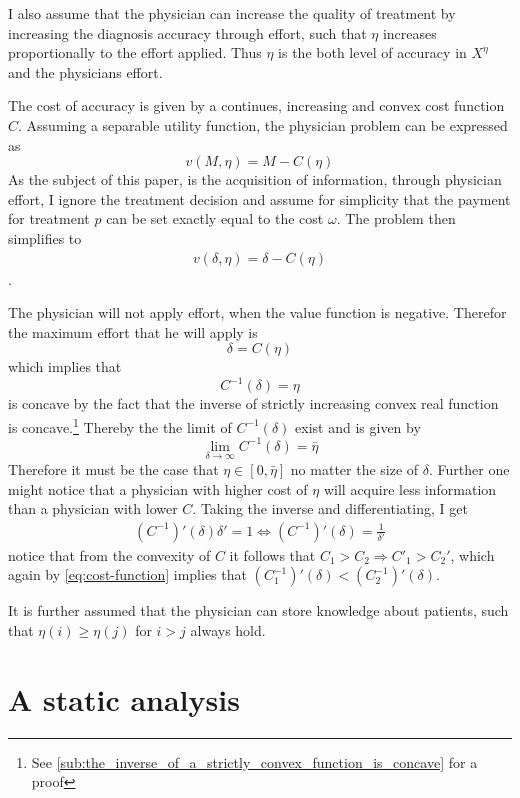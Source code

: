  I also assume that the physician can increase the quality of treatment by increasing the diagnosis accuracy through effort, such that \(\eta\) increases proportionally to the effort applied. Thus \(\eta\) is the both level of accuracy in \(X^\eta\) and the physicians effort. 

 The cost of accuracy is given by a continues, increasing and convex cost function \(C\). Assuming a separable utility function, the physician problem can be expressed as
\[
	v(M,\eta)=M-C(\eta)
\]
As the subject of this paper, is the acquisition of information, through physician effort, I ignore the treatment decision and assume for simplicity that the payment for treatment \(p\) can be set exactly equal to the cost \(\omega\).  The problem then simplifies to
\begin{align}
v(\delta,\eta)=\delta-C(\eta)\label{eq:phys-utility}
\end{align}.

The physician will not apply effort, when the value function is negative. Therefor the maximum effort that he will apply is 
\[
	\delta=C(\eta)
\]
which implies that 
\[
	C^{-1}(\delta)=\eta
\]
is concave by the fact that the inverse of strictly increasing convex real function is concave.\footnote{
See \cref{sub:the_inverse_of_a_strictly_convex_function_is_concave} for a proof} Thereby the the limit of \(C^{-1}(\delta)\) exist and is given by 
\[
	\lim_{\delta \rightarrow\infty}C^{-1}(\delta)=\bar{\eta}
\]
Therefore it must be the case that \(\eta\in[0,\bar{\eta}]\) no matter the size of \(\delta\).
Further one might notice that a physician with higher cost of \(\eta\) will acquire less information than a physician with lower \(C\).  Taking the inverse and differentiating, I get  
\begin{align}
    (C^{-1})'(\delta)\delta'=1 \Leftrightarrow  (C^{-1})'(\delta)=\frac{1}{\delta'}\label{eq:cost-function}
\end{align}
notice that from the convexity of \(C\)  it follows that \(C_1>C_2 \Rightarrow C'_1>C_2'\), which again by \cref{eq:cost-function} implies that \((C^{-1}_1)'(\delta)<(C^{-1}_2)'(\delta)\). 

It is further assumed that the physician can store knowledge about patients, such that \(\eta(i)\geq\eta(j)\) for \(i>j\) always hold. 

\section{A static analysis} %
\label{sec:atatic_analysis}


